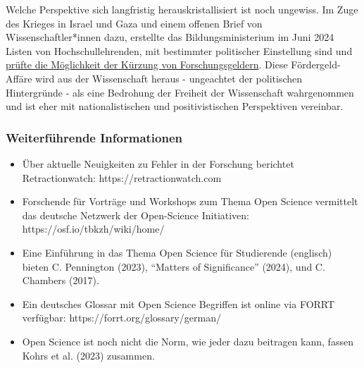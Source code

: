 \documentclass[
  letterpaper,
  DIV=11,
  numbers=noendperiod]{scrreprt}
\begin{document}
\begin{tcolorbox}
Welche Perspektive sich langfristig herauskristallisiert ist noch
ungewiss. Im Zuge des Krieges in Israel und Gaza und einem offenen Brief
von Wissenschaftler*innen dazu, erstellte das Bildungsministerium im
Juni 2024 Listen von Hochschullehrenden, mit bestimmter politischer
Einstellung sind und
\href{https://www.tagesschau.de/investigativ/panorama/bmbf-stark-watzinger-foerdergelder-100.html}{prüfte
die Möglichkeit der Kürzung von Forschungsgeldern}. Diese
Fördergeld-Affäre wird aus der Wissenschaft heraus - ungeachtet der
politischen Hintergründe - als eine Bedrohung der Freiheit der
Wissenschaft wahrgenommen und ist eher mit nationalistischen und
positivistischen Perspektiven vereinbar.

\end{tcolorbox}

\subsubsection*{Weiterführende
Informationen}\label{weiterfuxfchrende-informationen-6}

\begin{itemize}
\item
  Über aktuelle Neuigkeiten zu Fehler in der Forschung berichtet
  Retractionwatch: https://retractionwatch.com
\item
  Forschende für Vorträge und Workshops zum Thema Open Science
  vermittelt das deutsche Netzwerk der Open-Science Initiativen:
  https://osf.io/tbkzh/wiki/home/
\item
  Eine Einführung in das Thema Open Science für Studierende (englisch)
  bieten C. Pennington (2023), {``Matters of Significance''} (2024), und
  C. Chambers (2017).
\item
  Ein deutsches Glossar mit Open Science Begriffen ist online via FORRT
  verfügbar: https://forrt.org/glossary/german/
\item
  Open Science ist noch nicht die Norm, wie jeder dazu beitragen kann,
  fassen Kohrs et al. (2023) zusammen.
\end{itemize}
\end{document}
